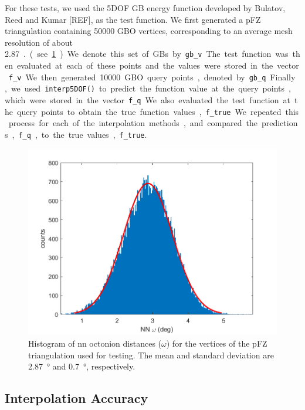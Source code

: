 \documentclass[preprint,12pt]{elsarticle}
\begin{document}
For these tests, we used the 5DOF GB energy function developed by Bulatov, Reed and Kumar [REF], as the test function. We first generated a pFZ triangulation containing \num{50000} GBO vertices, corresponding to an average mesh resolution of about \SI{2.87}{\degree.} (see \cref{fig:nndist}). We denote this set of GBs by \texttt{gb\_v}. The test function was then evaluated at each of these points and the values were stored in the vector \texttt{f\_v}. We then generated \num{10000} GBO query points, denoted by \texttt{gb\_q}. Finally, we used \texttt{interp5DOF()} to predict the function value at the query points, which were stored in the vector \texttt{f\_q}. We also evaluated the test function at the query points to obtain the true function values, \texttt{f\_true}. We repeated this process for each of the interpolation methods, and compared the predictions, \texttt{f\_q}, to the true values, \texttt{f\_true}.
\begin{figure}
\centering
\includegraphics[width=0.5\linewidth]{disthist50000.png}
\caption{Histogram of \acrlong{nn} octonion distances ($\omega$) for the vertices of the pFZ triangulation used for testing. The mean and standard deviation are \SI{2.87}{\degree} and \SI{0.7}{\degree}, respectively.}
\label{fig:nndist}
\end{figure}

\subsection{Interpolation Accuracy}
\label{sec:results:accuracy}
\end{document}
